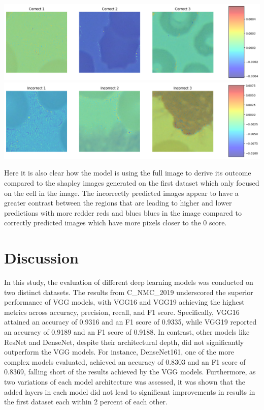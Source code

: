 \documentclass[
	a4paper,
	10pt,
	unnumberedsections,
	twoside,
]{research_article}
\begin{document}
\begin{center}
	\includegraphics[width=\linewidth]{images/dataset2_shap_correct.png}
	\includegraphics[width=\linewidth]{images/dataset2_shap_incorrect.png}
\end{center}

Here it is also clear how the model is using the full image to derive its outcome compared to the shapley images generated on the first dataset which only focused on the cell in the image. The incorrectly predicted images appear to have a greater contrast between the regions that are leading to higher and lower predictions with more redder reds and blues blues in the image compared to correctly predicted images which have more pixels closer to the 0 score.

\twocolumn

\section{Discussion}
\vspace{-1mm}
In this study, the evaluation of different deep learning models was conducted on two distinct datasets. The results from C\_NMC\_2019 underscored the superior performance of VGG models, with VGG16 and VGG19 achieving the highest metrics across accuracy, precision, recall, and F1 score. Specifically, VGG16 attained an accuracy of 0.9316 and an F1 score of 0.9335, while VGG19 reported an accuracy of 0.9189 and an F1 score of 0.9188. In contrast, other models like ResNet and DenseNet, despite their architectural depth, did not significantly outperform the VGG models. For instance, DenseNet161, one of the more complex models evaluated, achieved an accuracy of 0.8303 and an F1 score of 0.8369, falling short of the results achieved by the VGG models. Furthermore, as two variations of each model architecture was assessed, it was shown that the added layers in each model did not lead to significant improvements in results in the first dataset each within 2 percent of each other.
\end{document}
